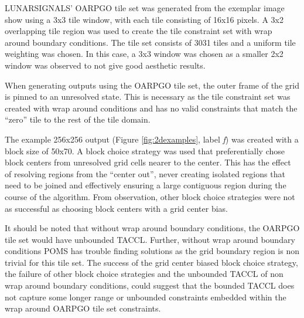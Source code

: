 LUNARSIGNALS' OARPGO tile set was generated from the exemplar image show using a 3x3 tile window, with each tile consisting
of 16x16 pixels.
A 3x2 overlapping tile region was used to create the tile constraint set with wrap around boundary conditions.
The tile set consists of 3031 tiles and a uniform tile weighting was chosen.
In this case, a 3x3 window was chosen as a smaller 2x2 window was observed to not give good aesthetic results.

When generating outputs using the OARPGO tile set, the outer frame of the grid is pinned to an unresolved state.
This is necessary as the tile constraint set was created with wrap around conditions and has no valid constraints that match the ``zero'' tile
to the rest of the tile domain.

The example 256x256 output (Figure \ref{fig:2dexamples}, label \textit{f})
was created with a block size of 50x70.
A block choice strategy was used that preferentially chose block centers from unresolved grid cells
nearer to the center.
This has the effect of resolving regions from the ``center out'', never creating isolated regions that need to be joined and effectively
  ensuring a large contiguous region during the course of the algorithm.
From observation, other block choice strategies were not as successful as choosing block centers with a grid center bias.

It should be noted that without wrap around boundary conditions, the OARPGO tile set would have unbounded TACCL.
Further, without wrap around boundary conditions POMS has trouble finding solutions as the
grid boundary region is non trivial for this tile set.
The success of the grid center biased block choice strategy, the failure of other block choice strategies and the unbounded TACCL of
non wrap around boundary conditions, could suggest that the bounded TACCL does not capture some longer range or unbounded constraints
  embedded within the wrap around OARPGO tile set constraints.

